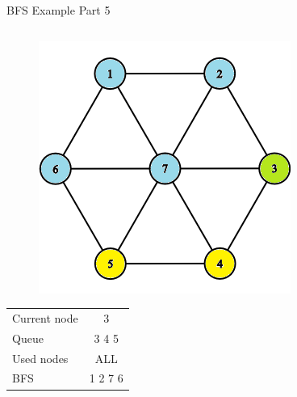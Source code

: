 \documentclass[aspectratio=169]{beamer}%
\begin{document}
\begin{frame}{BFS Example Part 5}
    \begin{columns}
        \begin{column}{0.32\textwidth}
            \begin{figure}[!ht]
                \centering
                \includegraphics[width=0.9\linewidth]{bfs 13.png}
            \end{figure}
            \begin{table}[ht]
                \centering
                \begin{tabular}{l c}
                    Current node & 3\\
                    Queue & 3 4 5\\ 
                    Used nodes & ALL\\
                    BFS & 1 2 7 6
                \end{tabular}
            \end{table}
        \end{column}
        \hfill
        \begin{column}{0.32\textwidth}
            \begin{figure}[!ht]
                \centering

\end{figure}
\end{column}
\end{columns}
\end{frame}
\end{document}
